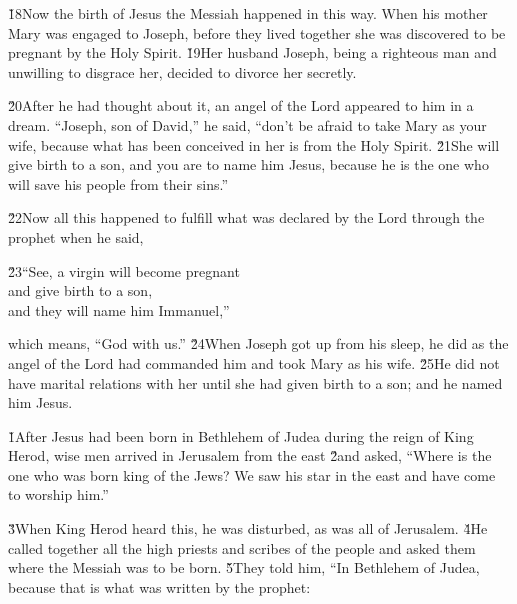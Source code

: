 \v{18}Now the birth of Jesus the Messiah happened in this way. When his mother Mary was engaged to Joseph, before they lived together she was discovered to be pregnant by the Holy Spirit. \v{19}Her husband Joseph, being a righteous man and unwilling to disgrace her, decided to divorce her secretly.

\v{20}After he had thought about it, an angel of the Lord appeared to him in a dream. ``Joseph, son of David,'' he said, ``don't be afraid to take Mary as your wife, because what has been conceived in her is from the Holy Spirit. \v{21}She will give birth to a son, and you are to name him Jesus, because he is the one who will save his people from their sins.''

\v{22}Now all this happened to fulfill what was declared by the Lord through the prophet when he said,

\begin{poetry}
\poeml \v{23}``See, a virgin will become pregnant \\
\poemll    and give birth to a son, \\
\poemlll       and they will name him Immanuel,''
\end{poetry}

which means, ``God with us.'' \v{24}When Joseph got up from his sleep, he did as the angel of the Lord had commanded him and took Mary as his wife. \v{25}He did not have marital relations with her until she had given birth to a son; and he named him Jesus.

\v{1}After Jesus had been born in Bethlehem of Judea during the reign of King Herod, wise men arrived in Jerusalem from the east \v{2}and asked, ``Where is the one who was born king of the Jews? We saw his star in the east and have come to worship him.''

\v{3}When King Herod heard this, he was disturbed, as was all of Jerusalem. \v{4}He called together all the high priests and scribes of the people and asked them where the Messiah was to be born. \v{5}They told him, ``In Bethlehem of Judea, because that is what was written by the prophet:

